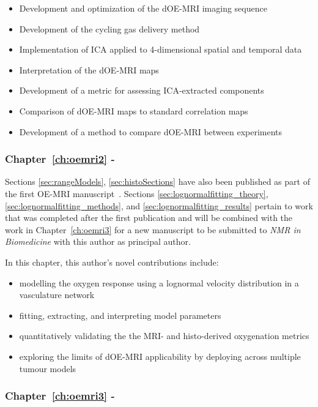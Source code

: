 \begin{itemize}
\item Development and optimization of the \acs{dOE-MRI} imaging sequence
\item Development of the cycling gas delivery method
\item Implementation of \acs{ICA} applied to 4-dimensional spatial and temporal data
\item Interpretation of the \acs{dOE-MRI} maps
\item Development of a metric for assessing ICA-extracted components
\item Comparison of \acs{dOE-MRI} maps to standard correlation maps
\item Development of a method to compare \acs{dOE-MRI} between experiments
\end{itemize}

\subsubsection{Chapter~\ref{ch:oemri2} - }
Sections \ref{sec:rangeModels}, \ref{sec:histoSections} have also been published as part of the first OE-MRI manuscript~\cite{Moosvi:2018ca}.
Sections \ref{sec:lognormalfitting_theory}, \ref{sec:lognormalfitting_methods}, and \ref{sec:lognormalfitting_results} pertain to work that was completed after the first publication and will be combined with the work in Chapter~\ref{ch:oemri3} for a new manuscript to be submitted to \textit{NMR in Biomedicine} with this author as principal author.

In this chapter, this author's novel contributions include:

\begin{itemize}
\item modelling the oxygen response using a lognormal velocity distribution in a vasculature network
\item fitting, extracting, and interpreting model parameters
\item quantitatively validating the the MRI- and histo-derived oxygenation metrics
\item exploring the limits of dOE-MRI applicability by deploying across multiple tumour models
\end{itemize}

\subsubsection{Chapter~\ref{ch:oemri3} - }

